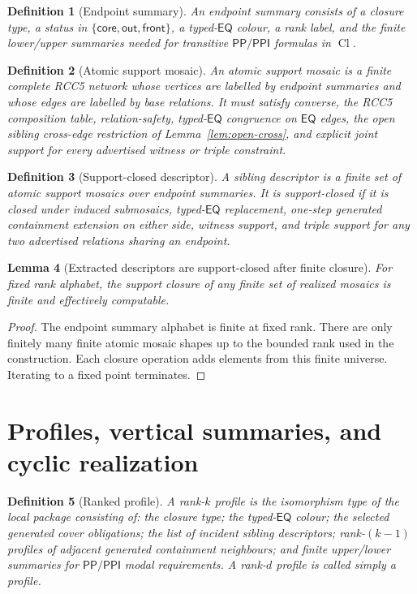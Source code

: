 \documentclass[11pt]{article}
\newtheorem{definition}{Definition}[section]
\newtheorem{lemma}[definition]{Lemma}
\theoremstyle{remark}
\newcommand{\PP}{\mathsf{PP}}
\newcommand{\PPI}{\mathsf{PPI}}
\newcommand{\EQ}{\mathsf{EQ}}
\newcommand{\Cl}{\operatorname{Cl}}
\newcommand{\core}{\mathsf{core}}
\newcommand{\front}{\mathsf{front}}
\newcommand{\out}{\mathsf{out}}
\begin{document}
\begin{definition}[Endpoint summary]
An endpoint summary consists of a closure type, a status in $\{\core,\out,\front\}$, a typed-$\EQ$ colour, a rank label, and the finite lower/upper summaries needed for transitive $\PP/\PPI$ formulas in $\Cl$.
\end{definition}

\begin{definition}[Atomic support mosaic]\label{def:mosaic}
An atomic support mosaic is a finite complete RCC5 network whose vertices are labelled by endpoint summaries and whose edges are labelled by base relations.  It must satisfy converse, the RCC5 composition table, relation-safety, typed-$\EQ$ congruence on $\EQ$ edges, the open sibling cross-edge restriction of Lemma~\ref{lem:open-cross}, and explicit joint support for every advertised witness or triple constraint.
\end{definition}

\begin{definition}[Support-closed descriptor]\label{def:descriptor}
A sibling descriptor is a finite set of atomic support mosaics over endpoint summaries.  It is support-closed if it is closed under induced submosaics, typed-$\EQ$ replacement, one-step generated containment extension on either side, witness support, and triple support for any two advertised relations sharing an endpoint.
\end{definition}

\begin{lemma}[Extracted descriptors are support-closed after finite closure]\label{lem:support-closure}
For fixed rank alphabet, the support closure of any finite set of realized mosaics is finite and effectively computable.
\end{lemma}
\begin{proof}
The endpoint summary alphabet is finite at fixed rank.  There are only finitely many finite atomic mosaic shapes up to the bounded rank used in the construction.  Each closure operation adds elements from this finite universe.  Iterating to a fixed point terminates.
\end{proof}

\section{Profiles, vertical summaries, and cyclic realization}
\begin{definition}[Ranked profile]\label{def:profile}
A rank-$k$ profile is the isomorphism type of the local package consisting of: the closure type; the typed-$\EQ$ colour; the selected generated cover obligations; the list of incident sibling descriptors; rank-$(k-1)$ profiles of adjacent generated containment neighbours; and finite upper/lower summaries for $\PP/\PPI$ modal requirements.  A rank-$d$ profile is called simply a profile.
\end{definition}
\end{document}
